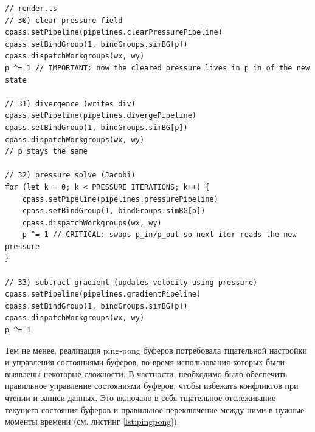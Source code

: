 \begin{lstlisting}[language=ES6, caption=Пример использования ping-pong буферов для решения давления, label={lst:pingpong}]
// render.ts
// 30) clear pressure field
cpass.setPipeline(pipelines.clearPressurePipeline)
cpass.setBindGroup(1, bindGroups.simBG[p])
cpass.dispatchWorkgroups(wx, wy)
p ^= 1 // IMPORTANT: now the cleared pressure lives in p_in of the new state

// 31) divergence (writes div)
cpass.setPipeline(pipelines.divergePipeline)
cpass.setBindGroup(1, bindGroups.simBG[p])
cpass.dispatchWorkgroups(wx, wy)
// p stays the same

// 32) pressure solve (Jacobi)
for (let k = 0; k < PRESSURE_ITERATIONS; k++) {
    cpass.setPipeline(pipelines.pressurePipeline)
    cpass.setBindGroup(1, bindGroups.simBG[p])
    cpass.dispatchWorkgroups(wx, wy)
    p ^= 1 // CRITICAL: swaps p_in/p_out so next iter reads the new pressure
}

// 33) subtract gradient (updates velocity using pressure)
cpass.setPipeline(pipelines.gradientPipeline)
cpass.setBindGroup(1, bindGroups.simBG[p])
cpass.dispatchWorkgroups(wx, wy)
p ^= 1
\end{lstlisting}

Тем не менее, реализация ping-pong буферов потребовала тщательной настройки и управления состояниями буферов, во время использования которых были выявлены некоторые сложности. В частности, необходимо было обеспечить правильное управление состояниями буферов, чтобы избежать конфликтов при чтении и записи данных. Это включало в себя тщательное отслеживание текущего состояния буферов и правильное переключение между ними в нужные моменты времени (см. листинг \ref{lst:pingpong}).

